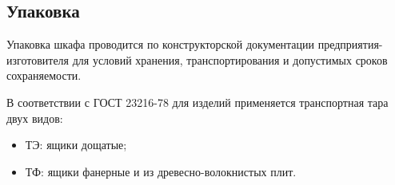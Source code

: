 {\color{unimain}\subsection{Упаковка}}

\begin{enumsub}
\item Упаковка шкафа проводится по конструкторской документации предприятия-изготовителя для условий хранения, транспортирования и допустимых сроков сохраняемости.
\item В соответствии с ГОСТ 23216-78 для изделий применяется транспортная тара двух видов:
  \begin{itemize}
  \item ТЭ: ящики дощатые;
  \item ТФ: ящики фанерные и из древесно-волокнистых плит.
  \end{itemize}
\end{enumsub}